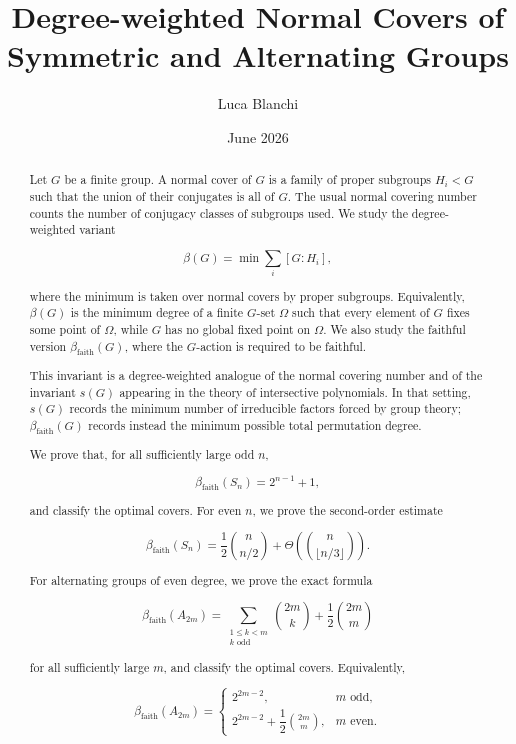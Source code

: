 \documentclass[11pt]{article}
\begin{document}
\title{Degree-weighted Normal Covers of Symmetric and Alternating Groups}
\author{Luca Blanchi}
\date{June 2026}

\maketitle

\begin{abstract}
Let $G$ be a finite group. A normal cover of $G$ is a family of proper subgroups $H_i<G$ such that the union of their conjugates is all of $G$. The usual normal covering number counts the number of conjugacy classes of subgroups used. We study the degree-weighted variant

\[
\beta(G)=\min\sum_i [G:H_i],
\]

where the minimum is taken over normal covers by proper subgroups. Equivalently, $\beta(G)$ is the minimum degree of a finite $G$-set $\Omega$ such that every element of $G$ fixes some point of $\Omega$, while $G$ has no global fixed point on $\Omega$. We also study the faithful version $\beta_{\mathrm{faith}}(G)$, where the $G$-action is required to be faithful.

This invariant is a degree-weighted analogue of the normal covering number and of the invariant $s(G)$ appearing in the theory of intersective polynomials. In that setting, $s(G)$ records the minimum number of irreducible factors forced by group theory; $\beta_{\mathrm{faith}}(G)$ records instead the minimum possible total permutation degree.

We prove that, for all sufficiently large odd $n$,

\[
\beta_{\mathrm{faith}}(S_n)=2^{n-1}+1,
\]

and classify the optimal covers. For even $n$, we prove the second-order estimate

\[
\beta_{\mathrm{faith}}(S_n)
=
\frac12\binom n{n/2}
+
\Theta\!\left(\binom n{\lfloor n/3\rfloor}\right).
\]

For alternating groups of even degree, we prove the exact formula

\[
\beta_{\mathrm{faith}}(A_{2m})
=
\sum_{\substack{1\le k<m\\ k\text{ odd}}}\binom{2m}{k}
+
\frac12\binom{2m}{m}
\]

for all sufficiently large $m$, and classify the optimal covers. Equivalently,

\[
\beta_{\mathrm{faith}}(A_{2m})
=
\begin{cases}
2^{2m-2}, & m\text{ odd},\\[4pt]
2^{2m-2}+\dfrac12\binom{2m}{m}, & m\text{ even}.
\end{cases}
\]


\end{abstract}
\end{document}
